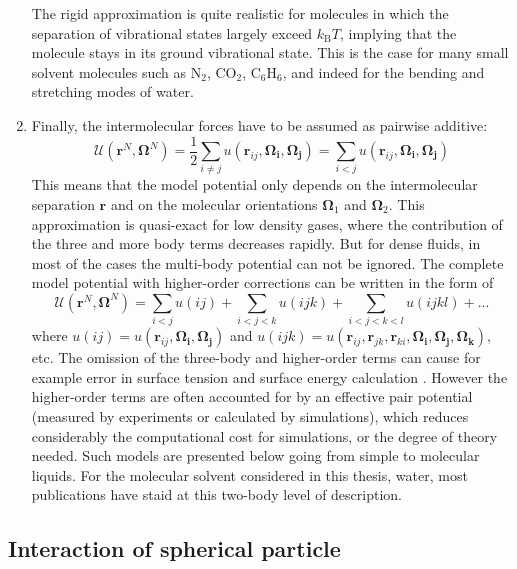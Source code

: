 \begin{enumerate}
The rigid approximation is quite realistic for molecules in which
the separation of vibrational states largely exceed $k_{\mathrm{B}}T$,
implying that the molecule stays in its ground vibrational state.
This is the case for many small solvent molecules such as $\mathrm{N_{2}}$,
$\mathrm{CO_{2}}$, $\mathrm{C_{6}H_{6}}$, and indeed for the bending
and stretching modes of water. 
\item Finally, the intermolecular forces have to be assumed as pairwise
additive:
\begin{equation}
\mathcal{U}(\mathbf{r}^{N},\mathbf{\Omega}^{N})=\frac{1}{2}\sum_{i\neq j}u(\mathbf{r}_{ij},\mathbf{\Omega_{i}},\mathbf{\Omega_{j}})=\sum_{i<j}u(\mathbf{r}_{ij},\mathbf{\Omega_{i}},\mathbf{\Omega_{j}})\label{eq:pair-potential}
\end{equation}
This means that the model potential only depends on the intermolecular
separation $\mathbf{r}$ and on the molecular orientations $\mathbf{\Omega}_{1}$
and $\mathbf{\Omega}_{2}$. This approximation is quasi-exact for
low density gases, where the contribution of the three and more body
terms decreases rapidly. But for dense fluids, in most of the cases
the multi-body potential can not be ignored. The complete model potential
with higher-order corrections can be written in the form of
\begin{equation}
\mathcal{U}(\mathbf{r}^{N},\mathbf{\Omega}^{N})=\sum_{i<j}u(ij)+\sum_{i<j<k}u(ijk)+\sum_{i<j<k<l}u(ijkl)+...
\end{equation}
where $u(ij)=u(\mathbf{r}_{ij},\mathbf{\Omega_{i}},\mathbf{\Omega_{j}})$
and $u(ijk)=u(\mathbf{r}_{ij},\mathbf{r}_{jk},\mathbf{r}_{ki},\mathbf{\Omega_{i}},\mathbf{\Omega_{j}},\mathbf{\Omega_{k}})$,
etc. The omission of the three-body and higher-order terms can cause
for example error in surface tension and surface energy calculation
\citep{Miyazaki_1975}. However the higher-order terms are often accounted
for by an effective pair potential (measured by experiments or calculated
by simulations), which reduces considerably the computational cost
for simulations, or the degree of theory needed. Such models are presented
below going from simple to molecular liquids. For the molecular solvent
considered in this thesis, water, most publications have staid at
this two-body level of description. 
\end{enumerate}

\subsection{Interaction of spherical particle}

